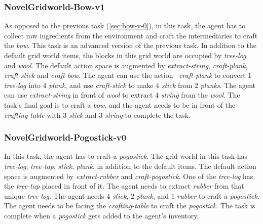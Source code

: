 \documentclass[sigconf]{aamas}
\begin{document}
\subsubsection{\textbf{NovelGridworld-Bow-v1}}
\label{sec:bow-v-1}
As opposed to the previous task (\ref{sec:bow-v-0}), in this task, the agent has to collect raw ingredients from the environment and craft the intermediaries to craft the \emph{bow}. This task is an advanced version of the previous task. In addition to the default grid world items, the blocks in this grid world are occupied by \emph{tree-log} and \emph{wool}. The default action space is augmented by \emph{extract-string}, \emph{craft-plank}, \emph{craft-stick} and \emph{craft-bow}. The agent can use the action ~\emph{craft-plank} to convert $1$ \emph{tree-log} into $4$ \emph{plank}, and use \emph{craft-stick} to make $4$ \emph{stick} from $2$ \emph{planks}. The agent can use \emph{extract-string} in front of \emph{wool} to extract $4$ \emph{string} from the \emph{wool}. The task's final goal is to craft a \emph{bow}, and the agent needs to be in front of the \emph{crafting-table} with $3$ \emph{stick} and $3$ \emph{string} to complete the task.
\subsubsection{\textbf{NovelGridworld-Pogostick-v0}}
\label{sec:pogo-v-0}
In this task, the agent has to craft a \emph{pogostick}. The grid world in this task has \emph{tree-log}, \emph{tree-tap}, \emph{stick}, \emph{plank}, in addition to the default items. The default action space is augmented by \emph{extract-rubber} and \emph{craft-pogostick}. One of the \emph{tree-log} has the \emph{tree-tap} placed in front of it. The agent needs to extract \emph{rubber} from that unique \emph{tree-log}. The agent needs $4$ \emph{stick}, $2$ \emph{plank}, and $1$ \emph{rubber} to craft a \emph{pogostick}. The agent needs to be facing the \emph{crafting-table} to craft the \emph{pogostick}. The task is complete when a \emph{pogostick} gets added to the agent's inventory.
\end{document}
